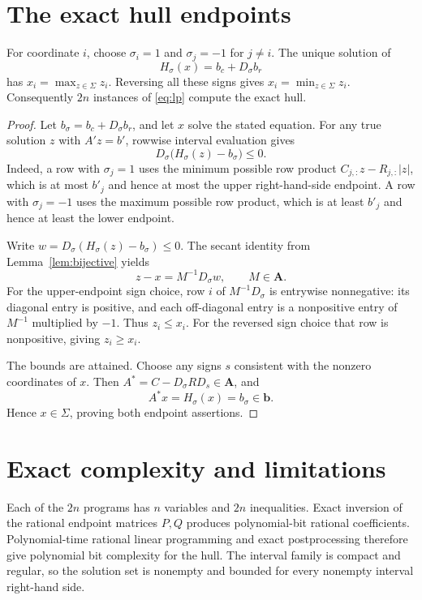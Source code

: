 \section{The exact hull endpoints}
\begin{theorem}\label{thm:hull}
For coordinate $i$, choose $\sigma_i=1$ and $\sigma_j=-1$ for $j\ne i$. The unique solution of
\[
 H_\sigma(x)=b_c+D_\sigma b_r
\]
has $x_i=\max_{z\in\Sigma}z_i$. Reversing all these signs gives $x_i=\min_{z\in\Sigma}z_i$. Consequently $2n$ instances of \eqref{eq:lp} compute the exact hull.
\end{theorem}
\begin{proof}
Let $b_\sigma=b_c+D_\sigma b_r$, and let $x$ solve the stated equation. For any true solution $z$ with $A'z=b'$, rowwise interval evaluation gives
\[
 D_\sigma\big(H_\sigma(z)-b_\sigma\big)\le0.
\]
Indeed, a row with $\sigma_j=1$ uses the minimum possible row product $C_{j,:}z-R_{j,:}|z|$, which is at most $b'_j$ and hence at most the upper right-hand-side endpoint. A row with $\sigma_j=-1$ uses the maximum possible row product, which is at least $b'_j$ and hence at least the lower endpoint.

Write $w=D_\sigma(H_\sigma(z)-b_\sigma)\le0$. The secant identity from Lemma~\ref{lem:bijective} yields
\[
 z-x=M^{-1}D_\sigma w,\qquad M\in\boldsymbol A.
\]
For the upper-endpoint sign choice, row $i$ of $M^{-1}D_\sigma$ is entrywise nonnegative: its diagonal entry is positive, and each off-diagonal entry is a nonpositive entry of $M^{-1}$ multiplied by $-1$. Thus $z_i\le x_i$. For the reversed sign choice that row is nonpositive, giving $z_i\ge x_i$.

The bounds are attained. Choose any signs $s$ consistent with the nonzero coordinates of $x$. Then $A^*=C-D_\sigma RD_s\in\boldsymbol A$, and
\[
 A^*x=H_\sigma(x)=b_\sigma\in\boldsymbol b.
\]
Hence $x\in\Sigma$, proving both endpoint assertions.
\end{proof}
\section{Exact complexity and limitations}
Each of the $2n$ programs has $n$ variables and $2n$ inequalities. Exact inversion of the rational endpoint matrices $P,Q$ produces polynomial-bit rational coefficients. Polynomial-time rational linear programming \cite{lp} and exact postprocessing therefore give polynomial bit complexity for the hull. The interval family is compact and regular, so the solution set is nonempty and bounded for every nonempty interval right-hand side.

